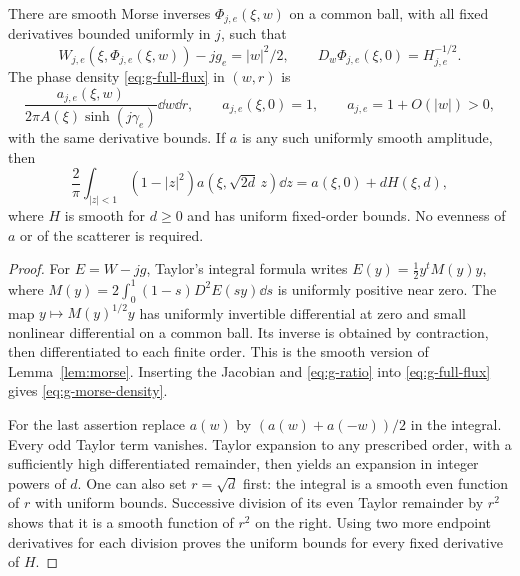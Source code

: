 \begin{lemma}\label{lem:g-radial}
There are smooth Morse inverses $\Phi_{j,e}(\xi,w)$ on a common ball,
with all fixed derivatives bounded uniformly in $j$, such that
\[
 W_{j,e}(\xi,\Phi_{j,e}(\xi,w))-jg_e=|w|^2/2,
 \qquad D_w\Phi_{j,e}(\xi,0)=H_{j,e}^{-1/2}.
\]
The phase density \eqref{eq:g-full-flux} in $(w,r)$ is
\begin{equation}\label{eq:g-morse-density}
 \frac{a_{j,e}(\xi,w)}{2\pi A(\xi)\sinh(j\gamma_e)}\dd w\dd r,
 \qquad a_{j,e}(\xi,0)=1,
 \qquad a_{j,e}=1+O(|w|)>0,
\end{equation}
with the same derivative bounds. If $a$ is any such uniformly smooth
amplitude, then
\[
 \frac2\pi\int_{|z|<1}(1-|z|^2)a(\xi,\sqrt{2d}\,z)\dd z
            =a(\xi,0)+dH(\xi,d),
\]
where $H$ is smooth for $d\ge0$ and has uniform fixed-order bounds.
No evenness of $a$ or of the scatterer is required.
\end{lemma}
\begin{proof}
For $E=W-jg$, Taylor's integral formula writes
$E(y)=\frac12 y^tM(y)y$, where
$M(y)=2\int_0^1(1-s)D^2E(sy)\dd s$ is uniformly positive near zero.
The map $y\mapsto M(y)^{1/2}y$ has uniformly invertible differential at
zero and small nonlinear differential on a common ball. Its inverse is
obtained by contraction, then differentiated to each finite order.
This is the smooth version of Lemma~\ref{lem:morse}. Inserting the
Jacobian and \eqref{eq:g-ratio} into \eqref{eq:g-full-flux} gives
\eqref{eq:g-morse-density}.

For the last assertion replace $a(w)$ by $(a(w)+a(-w))/2$ in the
integral. Every odd Taylor term vanishes. Taylor expansion to any
prescribed order, with a sufficiently high differentiated remainder,
then yields an expansion in integer powers of $d$. One can also set
$r=\sqrt d$ first: the integral is a smooth even function of $r$ with
uniform bounds. Successive division of its even Taylor remainder by
$r^2$ shows that it is a smooth function of $r^2$ on the right.
Using two more endpoint derivatives for each division proves the
uniform bounds for every fixed derivative of $H$.
\end{proof}

